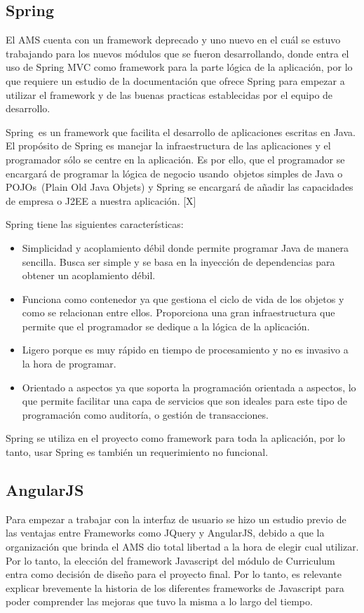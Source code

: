 \subsection{Spring}
El AMS cuenta con un framework deprecado y uno nuevo en el cuál se estuvo trabajando para los nuevos módulos que se fueron desarrollando, donde entra el uso de Spring MVC como framework para la parte lógica de la aplicación, por lo que requiere un estudio de la documentación que ofrece Spring para empezar a utilizar el framework y de las buenas practicas establecidas por el equipo de desarrollo.

Spring es un framework que facilita el desarrollo de aplicaciones escritas en Java. El propósito de Spring es manejar la infraestructura de las aplicaciones y el programador sólo se centre en la aplicación. Es por ello, que el programador se encargará de programar la lógica de negocio usando objetos simples de Java o POJOs (Plain Old Java Objets) y Spring se encargará de añadir las capacidades de empresa o J2EE a nuestra aplicación. [X]

Spring tiene las siguientes características:
\begin{itemize}
	\item Simplicidad y acoplamiento débil donde permite programar Java de manera sencilla. Busca ser simple y se basa en la inyección de dependencias para obtener un acoplamiento débil.
	\item Funciona como contenedor ya que gestiona el ciclo de vida de los objetos y como se relacionan entre ellos. Proporciona una gran infraestructura que permite que el programador se dedique a la lógica de la aplicación.
	\item Ligero porque es muy rápido en tiempo de procesamiento y no es invasivo a la hora de programar.
	\item Orientado a aspectos ya que soporta la programación orientada a aspectos, lo que permite facilitar una capa de servicios que son ideales para este tipo de programación como auditoría, o gestión de transacciones.
\end{itemize} 

Spring se utiliza en el proyecto como framework para toda la aplicación, por lo tanto, usar Spring es también un requerimiento no funcional.

\subsection{AngularJS}
Para empezar a trabajar con la interfaz de usuario se hizo un estudio previo de las ventajas entre Frameworks como JQuery y AngularJS, debido a que la organización que brinda el AMS dio total libertad a la hora de elegir cual utilizar. Por lo tanto, la elección del framework Javascript del módulo de Curriculum entra como decisión de diseño para el proyecto final.  Por lo tanto, es relevante explicar brevemente la historia de los diferentes frameworks de Javascript para poder comprender las mejoras que tuvo la misma a lo largo del tiempo.

